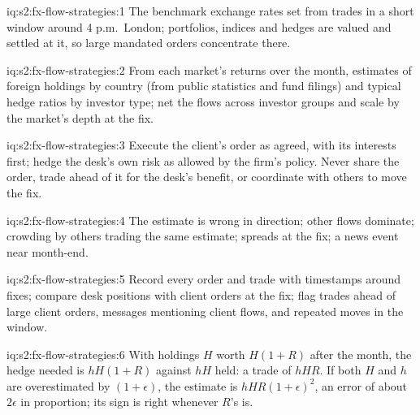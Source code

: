\begin{solution}{iq:s2:fx-flow-strategies:1}
The benchmark exchange rates set from trades in a short window around 4 p.m.\ London; portfolios, indices and hedges are valued and settled at it, so
large mandated orders concentrate there.
\end{solution}

\begin{solution}{iq:s2:fx-flow-strategies:2}
From each market's returns over the month, estimates of foreign holdings by country (from public statistics and fund filings) and typical hedge
ratios by investor type; net the flows across investor groups and scale by the market's depth at the fix.
\end{solution}

\begin{solution}{iq:s2:fx-flow-strategies:3}
Execute the client's order as agreed, with its interests first; hedge the desk's own risk as allowed by the firm's policy. Never share the order,
trade ahead of it for the desk's benefit, or coordinate with others to move the fix.
\end{solution}

\begin{solution}{iq:s2:fx-flow-strategies:4}
The estimate is wrong in direction; other flows dominate; crowding by others trading the same estimate; spreads at the fix; a news event near month-end.
\end{solution}

\begin{solution}{iq:s2:fx-flow-strategies:5}
Record every order and trade with timestamps around fixes; compare desk positions with client orders at the fix; flag trades ahead of large client
orders, messages mentioning client flows, and repeated moves in the window.
\end{solution}

\begin{solution}{iq:s2:fx-flow-strategies:6}
With holdings $H$ worth $H(1 + R)$ after the month, the hedge needed is $hH(1 + R)$ against $hH$ held: a trade of $hHR$. If both $H$ and $h$ are
overestimated by $(1 + \epsilon)$, the estimate is $hHR(1 + \epsilon)^2$, an error of about $2\epsilon$ in proportion; its sign is right whenever
$R$'s is.
\end{solution}
